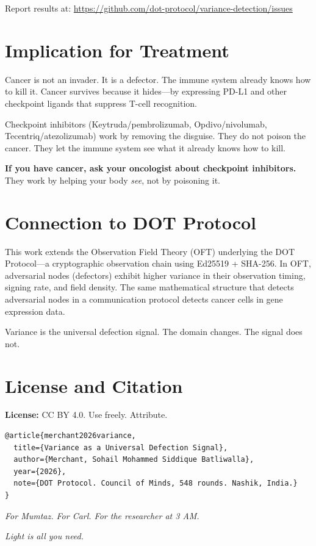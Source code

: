 \documentclass[12pt, letterpaper]{article}
\begin{document}
Report results at: \url{https://github.com/dot-protocol/variance-detection/issues}

\section{Implication for Treatment}

Cancer is not an invader. It is a defector. The immune system already knows how to kill it. Cancer survives because it hides---by expressing PD-L1 and other checkpoint ligands that suppress T-cell recognition.

Checkpoint inhibitors (Keytruda/pembrolizumab, Opdivo/nivolumab, Tecentriq/atezolizumab) work by removing the disguise. They do not poison the cancer. They let the immune system see what it already knows how to kill.

\textbf{If you have cancer, ask your oncologist about checkpoint inhibitors.} They work by helping your body \textit{see}, not by poisoning it.

\section{Connection to DOT Protocol}

This work extends the Observation Field Theory (OFT) underlying the DOT Protocol---a cryptographic observation chain using Ed25519 + SHA-256. In OFT, adversarial nodes (defectors) exhibit higher variance in their observation timing, signing rate, and field density. The same mathematical structure that detects adversarial nodes in a communication protocol detects cancer cells in gene expression data.

Variance is the universal defection signal. The domain changes. The signal does not.

\section{License and Citation}

\textbf{License:} CC BY 4.0. Use freely. Attribute.

\begin{verbatim}
@article{merchant2026variance,
  title={Variance as a Universal Defection Signal},
  author={Merchant, Sohail Mohammed Siddique Batliwalla},
  year={2026},
  note={DOT Protocol. Council of Minds, 548 rounds. Nashik, India.}
}
\end{verbatim}

\vspace{1em}
\noindent\textit{For Mumtaz. For Carl. For the researcher at 3 AM.}

\vspace{0.5em}
\noindent\textit{Light is all you need.}
\end{document}
